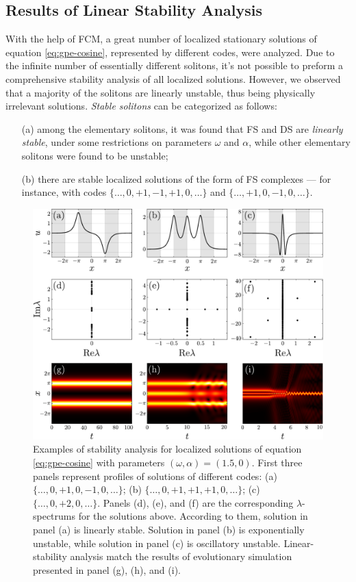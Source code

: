 \subsection{Results of Linear Stability Analysis}

With the help of FCM, a great number of localized stationary solutions of equation \eqref{eq:gpe-cosine}, represented by different codes, were analyzed.
Due to the infinite number of essentially different solitons, it's not possible to preform a comprehensive stability analysis of all localized solutions.
However, we observed that a majority of the solitons are linearly unstable, thus being physically irrelevant solutions.
{\it Stable solitons} can be categorized as follows:
\begin{itemize}
	\item[(a)] among the elementary solitons, it was found that FS and DS are {\it linearly stable}, under some restrictions on parameters $\omega$ and $\alpha$, while other elementary solitons were found to be unstable;
	\item[(b)] there are stable localized solutions of the form of FS complexes --- for instance, with codes $\{ \dots, 0, +1, -1, +1, 0, \dots \}$ and $\{ \dots, +1, 0, -1, 0, \dots \}$.
\end{itemize}

\begin{figure}[h!]
\centering
	\includegraphics[scale = 1]{pic/stability demonstration for cosine equation}
	\caption{
		Examples of stability analysis for localized solutions of equation \eqref{eq:gpe-cosine} with parameters $(\omega, \alpha) = (1.5, 0)$.
		First three panels represent profiles of solutions of different codes: (a) $\{ \dots, 0, +1, 0, -1, 0, \dots \}$; (b) $\{ \dots, 0, +1, +1, +1, 0, \dots \}$; (c) $\{ \dots, 0, +2, 0, \dots \}$.
		Panels (d), (e), and (f) are the corresponding $\lambda$-spectrums for the solutions above.
		According to them, solution in panel (a) is linearly stable.
		Solution in panel (b) is exponentially unstable, while solution in panel (c) is oscillatory unstable.
		Linear-stability analysis match the results of evolutionary simulation presented in panel (g), (h), and (i).
	}
\label{fig:stability-cosine}
\end{figure}

